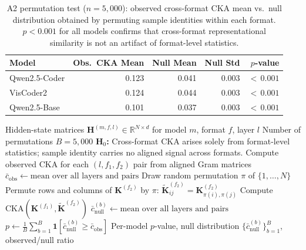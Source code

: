 \begin{table}[t]
\centering
\caption{A2 permutation test ($n{=}5{,}000$): observed cross-format CKA mean vs.\ null distribution obtained by permuting sample identities within each format.  $p{<}0.001$ for all models confirms that cross-format representational similarity is not an artifact of format-level statistics.}
\label{tab:a2_permutation}
\small
\begin{tabular}{l rrrr}
\toprule
\textbf{Model} & \textbf{Obs.\ CKA Mean} & \textbf{Null Mean} & \textbf{Null Std} & \textbf{$p$-value} \\
\midrule
Qwen2.5-Coder & 0.123 & 0.041 & 0.003 & ${<}\,0.001$ \\
VisCoder2      & 0.124 & 0.044 & 0.003 & ${<}\,0.001$ \\
Qwen2.5-Base   & 0.101 & 0.037 & 0.003 & ${<}\,0.001$ \\
\bottomrule
\end{tabular}
\end{table}


\begin{algorithm}[h!]
\caption{A2 Permutation Null Test for Cross-Format CKA}
\label{alg:perm_test}
\begin{algorithmic}[1]
\REQUIRE Hidden-state matrices $\mathbf{H}^{(m,f,l)} \in \mathbb{R}^{N \times d}$ for model $m$, format $f$, layer $l$
\REQUIRE Number of permutations $B = 5{,}000$
\STATE \textbf{H$_0$:} Cross-format CKA arises solely from format-level statistics; sample identity carries no aligned signal across formats.
  \STATE Compute observed CKA for each $(l, f_1, f_2)$ pair from aligned Gram matrices
  \STATE $\bar{c}_\text{obs} \leftarrow \text{mean over all layers and pairs}$
    \STATE Draw random permutation $\pi$ of $\{1, \ldots, N\}$
      \STATE Permute rows and columns of $\mathbf{K}^{(f_2)}$ by $\pi$: $\tilde{\mathbf{K}}^{(f_2)}_{ij} = \mathbf{K}^{(f_2)}_{\pi(i),\pi(j)}$
      \STATE Compute $\text{CKA}(\mathbf{K}^{(f_1)}, \tilde{\mathbf{K}}^{(f_2)})$
    \ENDFOR
    \STATE $\bar{c}_\text{null}^{(b)} \leftarrow \text{mean over all layers and pairs}$
  \ENDFOR
  \STATE $p \leftarrow \frac{1}{B} \sum_{b=1}^{B} \mathbf{1}[\bar{c}_\text{null}^{(b)} \geq \bar{c}_\text{obs}]$
\ENDFOR
\ENSURE Per-model $p$-value, null distribution $\{\bar{c}_\text{null}^{(b)}\}_{b=1}^B$, observed/null ratio
\end{algorithmic}
\end{algorithm}

